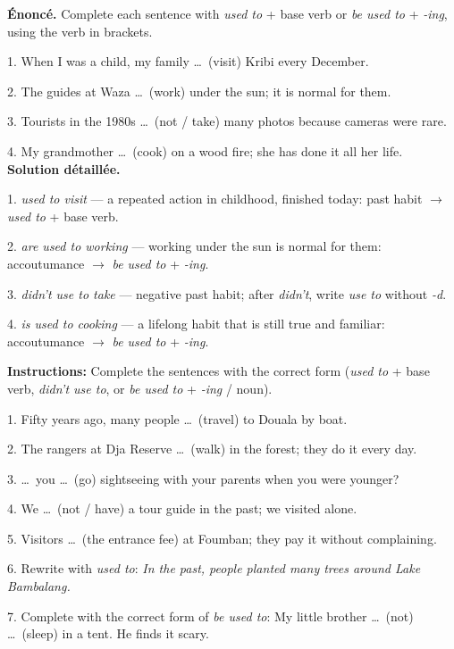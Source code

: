 \documentclass[11pt]{article}
\begin{document}
\begin{exoresolu}
\textbf{Énoncé.} Complete each sentence with \emph{used to} + base verb or \emph{be used to} + \emph{-ing}, using the verb in brackets.\par
1. When I was a child, my family \dots\ (visit) Kribi every December.\par
2. The guides at Waza \dots\ (work) under the sun; it is normal for them.\par
3. Tourists in the 1980s \dots\ (not / take) many photos because cameras were rare.\par
4. My grandmother \dots\ (cook) on a wood fire; she has done it all her life.
\tcblower
\textbf{Solution détaillée.}\par
1. \emph{used to visit} — a repeated action in childhood, finished today: past habit $\rightarrow$ \emph{used to} + base verb.\par
2. \emph{are used to working} — working under the sun is normal for them: accoutumance $\rightarrow$ \emph{be used to} + \emph{-ing}.\par
3. \emph{didn't use to take} — negative past habit; after \emph{didn't}, write \emph{use to} without \emph{-d}.\par
4. \emph{is used to cooking} — a lifelong habit that is still true and familiar: accoutumance $\rightarrow$ \emph{be used to} + \emph{-ing}.
\end{exoresolu}

\begin{exercice}
\textbf{Instructions:} Complete the sentences with the correct form (\emph{used to} + base verb, \emph{didn't use to}, or \emph{be used to} + \emph{-ing} / noun).\par
1. Fifty years ago, many people \dots\ (travel) to Douala by boat.\par
2. The rangers at Dja Reserve \dots\ (walk) in the forest; they do it every day.\par
3. \dots\ you \dots\ (go) sightseeing with your parents when you were younger?\par
4. We \dots\ (not / have) a tour guide in the past; we visited alone.\par
5. Visitors \dots\ (the entrance fee) at Foumban; they pay it without complaining.\par
6. Rewrite with \emph{used to}: \emph{In the past, people planted many trees around Lake Bambalang.}\par
7. Complete with the correct form of \emph{be used to}: My little brother \dots\ (not) \dots\ (sleep) in a tent. He finds it scary.
\end{exercice}
\end{document}
